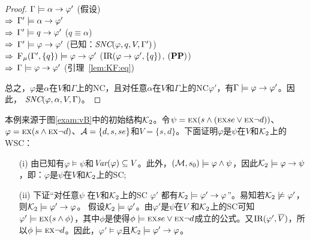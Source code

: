 \begin{proof}
	$\Gamma \models \alpha \rightarrow \varphi'$ \hfill  (假设)\\
	$\Rightarrow$ $\Gamma' \models \alpha \rightarrow \varphi'$ \\
	$\Rightarrow$ $\Gamma' \models q \rightarrow \varphi'$ \hfill  ($q \equiv \alpha$)\\
	$\Rightarrow$ $\Gamma' \models \varphi \rightarrow \varphi'$ \hfill (已知：$\emph{SNC}(\varphi,q,V,\Gamma')$)\\
	$\Rightarrow$ ${\textsc{F}_{\textsc{$\mu$}}}(\Gamma', \{q\}) \models \varphi \rightarrow \varphi'$ \hfill ($\textrm{IR}(\varphi \rightarrow \varphi', \{q\})$, $(\textbf{PP})$)\\
	$\Rightarrow$ $\Gamma \models \varphi \rightarrow \varphi'$ \hfill (引理~\ref{lem:KF:eq})
	
	总之，$\varphi$是$\alpha$在$V$和$\Gamma$上的NC，且对任意$\alpha$在$V$和$\Gamma$上的NC$\varphi'$，有$\Gamma \models \varphi \rightarrow \varphi'$。因此， $\emph{SNC}(\varphi,\alpha,V,\Gamma)$。
\end{proof}



\begin{example}\label{examp:WSC}
	本例来源于图\ref{exam:vB}中的初始结构${\cal K}_2$。令$\psi = \textsc{e} \textsc{x}(s \wedge (\textsc{e} \textsc{x} se \vee \textsc{e} \textsc{x} \neg d))$、$\varphi = \textsc{e} \textsc{x}(s \wedge \textsc{e} \textsc{x} \neg d)$、${\cal A} =\{d, s, se\}$和$V = \{s, d\}$。下面证明$\varphi$是$\psi$在$V$和${\cal K}_2$上的WSC：
	\begin{itemize}
		\item[(i)] 由已知有$\varphi \models \psi$和$\textit{Var}(\varphi) \subseteq V$。此外，$({\cal M}, s_0) \models \varphi \wedge \psi$，因此${\cal K}_2 \models \varphi \rightarrow \psi$，即：$\varphi$是$\psi$在$V$和${\cal K}_2$上的SC;
		\item[(ii)] 下证“对任意$\psi$ 在$V$和${\cal K}_2$上的SC $\varphi'$ 都有${\cal K}_2 \models \varphi' \rightarrow \varphi$”。易知若${\cal K}_2 \not \models \varphi'$，则${\cal K}_2\models \varphi' \rightarrow \varphi$。
		假设${\cal K}_2 \models \varphi'$。由$\varphi'$是$\psi$在$V$ 和${\cal K}_2$上的SC可知$\varphi' \models \textsc{e} \textsc{x}(s \wedge \phi)$，其中$\phi$是使得$\phi\models \textsc{e} \textsc{x} se \vee \textsc{e} \textsc{x} \neg d$成立的公式。又$\textrm{IR}(\varphi', \overline V)$，所以$\phi \models \textsc{e} \textsc{x} \neg d$。因此，$\varphi' \models \varphi$且${\cal K}_2 \models \varphi' \rightarrow \varphi$。
	\end{itemize}
\end{example}


